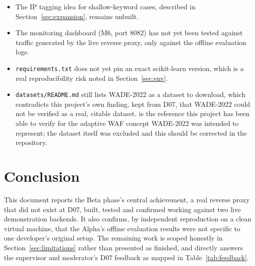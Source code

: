 \documentclass{llncs}
\begin{document}
\begin{itemize}
  \item The IP tagging idea for shallow-keyword cases, described in
        Section~\ref{sec:expansion}, remains unbuilt.
  \item The monitoring dashboard (M6, port 8082) has not yet been
        tested against traffic generated by the live reverse proxy,
        only against the offline evaluation logs.
  \item \texttt{requirements.txt} does not yet pin an exact
        scikit-learn version, which is a real reproducibility risk
        noted in Section~\ref{sec:env}.
  \item \texttt{datasets/README.md} still lists WADE-2022 as a dataset
        to download, which contradicts this project's own finding, kept
        from D07, that WADE-2022 could not be verified as a real,
        citable dataset. \citep{calvo2022} is the reference this
        project has been able to verify for the adaptive WAF concept
        WADE-2022 was intended to represent; the dataset itself was
        excluded and this should be corrected in the repository.
\end{itemize}

\clearpage
\section{Conclusion}

This document reports the Beta phase's central achievement, a real
reverse proxy that did not exist at D07, built, tested and confirmed
working against two live demonstration backends. It also confirms, by
independent reproduction on a clean virtual machine, that the Alpha's
offline evaluation results were not specific to one developer's original
setup. The remaining work is scoped honestly in
Section~\ref{sec:limitations} rather than presented as finished, and
directly answers the supervisor and moderator's D07 feedback as mapped
in Table~\ref{tab:feedback}.


\end{document}
